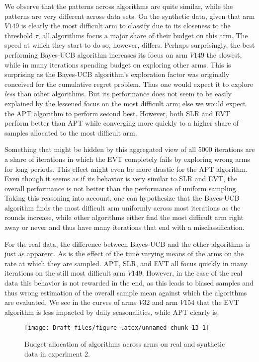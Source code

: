 \documentclass[11pt,]{article}
\begin{document}
We observe that the patterns across algorithms are quite similar, while
the patterns are very different across data sets. On the synthetic data,
given that arm \(V149\) is clearly the most difficult arm to classify
due to its closeness to the threshold \(\tau\), all algorithms focus a
major share of their budget on this arm. The speed at which they start
to do so, however, differs. Perhaps surprisingly, the best performing
Bayes-UCB algorithm increases its focus on arm \(V149\) the slowest,
while in many iterations spending budget on exploring other arms. This
is surprising as the Bayes-UCB algorithm's exploration factor was
originally conceived for the cumulative regret problem. Thus one would
expect it to explore \emph{less} than other algorithms. But its
performance does not seem to be easily explained by the lessened focus
on the most difficult arm; else we would expect the APT algorithm to
perform second best. However, both SLR and EVT perform better than APT
while converging more quickly to a higher share of samples allocated to
the most difficult arm.

Something that might be hidden by this aggregated view of all 5000
iterations are a share of iterations in which the EVT completely fails
by exploring wrong arms for long periods. This effect might even be more
drastic for the APT algorithm. Even though it seems as if its behavior
is very similar to SLR and EVT, the overall performance is not better
than the performance of uniform sampling. Taking this reasoning into
account, one can hypothesize that the Bayes-UCB algorithm finds the most
difficult arm uniformly across most iterations as the rounds increase,
while other algorithms either find the most difficult arm right away or
never and thus have many iterations that end with a misclassification.

For the real data, the difference between Bayes-UCB and the other
algorithms is just as apparent. As is the effect of the time varying
means of the arms on the rate at which they are sampled. APT, SLR, and
EVT all focus quickly in many iterations on the still most difficult arm
\(V149\). However, in the case of the real data this behavior is not
rewarded in the end, as this leads to biased samples and thus wrong
estimation of the overall sample mean against which the algorithms are
evaluated. We see in the curves of arms \(V32\) and arm \(V154\) that
the EVT algorithm is less impacted by daily seasonalities, while APT
clearly is.

\begin{figure}

{\centering \texttt{[image: Draft\_files/figure-latex/unnamed-chunk-13-1]} 

}

\caption{Budget allocation of algorithms across arms on real and synthetic data in experiment 2.}\label{fig:unnamed-chunk-13}
\end{figure}
\end{document}
